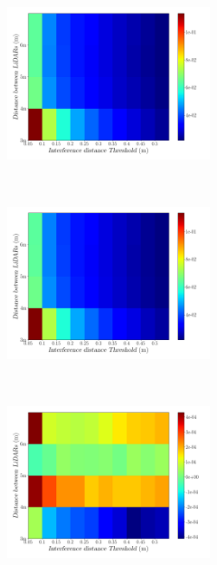 \begin{figure}[p]
	\centering
	\begin{subfigure}[c]{\textwidth}
		\centering
		\includegraphics[width=0.65\textwidth]{img/lidar-interference/human/interference_distance_color_mesh.png}
		\caption{}
		\label{fig:human:interference-color-mesh}
	\end{subfigure}
	\\ \vspace{2mm}
	\begin{subfigure}[c]{\textwidth}
		\centering
		\includegraphics[width=0.65\textwidth]{img/lidar-interference/human/ground_truth_distance_color_mesh.png}
		\caption{}
		\label{fig:human:ground-truth-color-mesh}
	\end{subfigure}
	\\ \vspace{2mm}
	\begin{subfigure}[c]{\textwidth}
		\centering
		\includegraphics[width=0.65\textwidth]{img/lidar-interference/human/difference_ground_truth_interference_measurement.png}
		\caption{}
		\label{fig:human:difference-color-mesh}
	\end{subfigure}


\end{figure}
